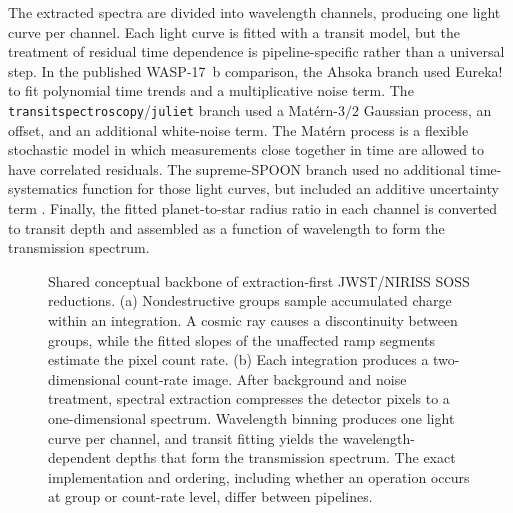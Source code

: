 The extracted spectra are divided into wavelength channels, producing one light
curve per channel. Each light curve is fitted with a transit model, but the
treatment of residual time dependence is pipeline-specific rather than a
universal step. In the published WASP-17~b comparison, the Ahsoka branch used
Eureka! to fit polynomial time trends and a multiplicative noise term. The
\texttt{transitspectroscopy}/\texttt{juliet} branch used a
Mat\'ern-$3/2$ Gaussian process, an offset, and an additional white-noise term.
The Mat\'ern process is a flexible stochastic model in which measurements close
together in time are allowed to have correlated residuals. The supreme-SPOON
branch used no additional time-systematics function for those light curves, but
included an additive uncertainty term \citep{LouieEtAl2025}. Finally, the
fitted planet-to-star radius ratio in each channel is converted to transit depth
and assembled as a function of wavelength to form the transmission spectrum.

\begin{figure}[t]
  \centering
  
  \caption{Shared conceptual backbone of extraction-first JWST/NIRISS SOSS
  reductions. (a) Nondestructive groups sample accumulated charge within an
  integration. A cosmic ray causes a discontinuity between groups, while the
  fitted slopes of the unaffected ramp segments estimate the pixel count rate.
  (b) Each integration produces a two-dimensional count-rate image. After
  background and noise treatment, spectral extraction compresses the detector
  pixels to a one-dimensional spectrum. Wavelength binning produces one light
  curve per channel, and transit fitting yields the wavelength-dependent depths
  that form the transmission spectrum. The exact implementation and ordering,
  including whether an operation occurs at group or count-rate level, differ
  between pipelines.}
  \label{fig:extraction-first-workflow}
\end{figure}


